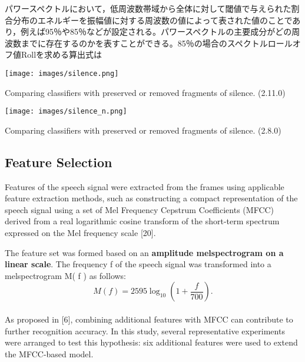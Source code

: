 パワースペクトルにおいて，低周波数帯域から全体に対して閾値で与えられた割合分布のエネルギーを振幅値に対する周波数の値によって表された値のことであり，例えば95％や85％などが設定される。パワースペクトルの主要成分がどの周波数までに存在するのかを表すことができる。85％の場合のスペクトルロールオフ値Rollを求める算出式は\documentclass[ams]{U-AizuGT}
\begin{document}
\begin{table}[h]
    \centering
    \texttt{[image: images/silence.png]}
    \caption{Comparing classifiers with preserved or removed fragments of silence. (2.11.0)}
\end{table}
\begin{table}[h]
    \centering
    \texttt{[image: images/silence\_n.png]}
    \caption{Comparing classifiers with preserved or removed fragments of silence. (2.8.0)}
\end{table}
\subsection{Feature Selection}
Features of the speech signal were extracted from the frames using applicable feature extraction methods, such as constructing a compact representation of the speech signal using a set of Mel Frequency Cepstrum Coefficients (MFCC) derived from a real logarithmic cosine transform of the short-term spectrum expressed on the Mel frequency scale [20].\par
The feature set was formed based on an \textbf{amplitude melspectrogram on a linear scale}. The frequency f of the speech signal was transformed into a melspectrogram M( f ) as follows:
\\
\begin{equation}
M(f)=2595\log_{10}(1+\frac{f}{700}).
\end{equation}
\\

As proposed in [6], combining additional features with MFCC can contribute to further recognition accuracy. In this study, several representative experiments were arranged to test this hypothesis: six additional features were used to extend the MFCC-based model.
\end{document}
